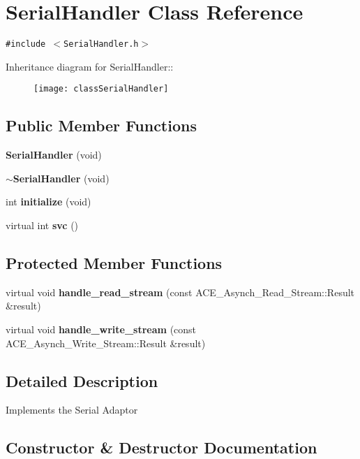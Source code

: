 \section{Serial\-Handler Class Reference}
\label{classSerialHandler}
{\tt \#include $<$Serial\-Handler.h$>$}

Inheritance diagram for Serial\-Handler::\begin{figure}[H]
\begin{center}
\leavevmode
\texttt{[image: classSerialHandler]}
\end{center}
\end{figure}
\subsection*{Public Member Functions}
\begin{CompactItemize}
\item 
{\bf Serial\-Handler} (void)
\item 
{\bf $\sim$Serial\-Handler} (void)
\item 
int {\bf initialize} (void)
\item 
virtual int {\bf svc} ()
\end{CompactItemize}
\subsection*{Protected Member Functions}
\begin{CompactItemize}
\item 
virtual void {\bf handle\_\-read\_\-stream} (const ACE\_\-Asynch\_\-Read\_\-Stream::Result \&result)
\item 
virtual void {\bf handle\_\-write\_\-stream} (const ACE\_\-Asynch\_\-Write\_\-Stream::Result \&result)
\end{CompactItemize}


\subsection{Detailed Description}
Implements the Serial Adaptor 



\subsection{Constructor \& Destructor Documentation}
